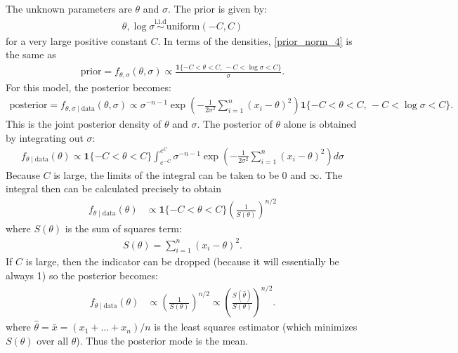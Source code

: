 \documentclass{scrartcl}
\begin{document}
The unknown parameters are $\theta$ and $\sigma$. The prior is given by:     
\begin{align}\label{prior_norm_4}
  \theta, \log \sigma \overset{\text{i.i.d}}{\sim} \text{uniform}(-C, C)
\end{align}
for a very large positive constant $C$. In terms of the densities,
\eqref{prior_norm_4} is the same as
\begin{align*}
\text{prior} = f_{\theta, \sigma}(\theta, \sigma)
\propto \frac{\mathbf{1}\{-C < \theta < C,\,-C < \log \sigma < C\}}{\sigma}.
\end{align*}
For this model, the posterior becomes: 
\begin{align*}
  \text{posterior} = f_{\theta, \sigma \mid \text{data}}(\theta,
                     \sigma)\propto \sigma^{-n-1}
                     \exp\left(-\frac{1}{2 
    \sigma^2}\sum_{i=1}^n(x_i - \theta)^2 \right)\mathbf{1}\{-C < \theta < C,\,-C < \log \sigma <
    C\}. 
\end{align*}
This is the joint posterior density of $\theta$ and $\sigma$. The
posterior of $\theta$ alone is obtained by integrating out $\sigma$: 
\begin{align*}
  f_{\theta \mid \text{data}}(\theta) \propto \mathbf{1}\{-C <
  \theta < C\} \int_{e^{-C}}^{e^C} \sigma^{-n-1} \exp\left(-\frac{1}{2
    \sigma^2}\sum_{i=1}^n(x_i - \theta)^2 \right) d\sigma
\end{align*}
Because $C$ is large, the limits of the integral can be taken to be
$0$ and $\infty$. The integral then can be calculated precisely to
obtain 
\begin{align*}
  f_{\theta \mid \text{data}}(\theta) &\propto \mathbf{1}\{-C <
  \theta < C\} \left(\frac{1}{S(\theta)} \right)^{n/2} 
\end{align*}
where $S(\theta)$ is the sum of squares term:
\begin{align*}
  S(\theta) = \sum_{i=1}^n (x_i - \theta)^2. 
\end{align*}
If $C$ is large, then the indicator can be dropped (because it will
essentially be always 1) so the posterior becomes:
\begin{align*}
  f_{\theta \mid \text{data}}(\theta) &\propto
                                        \left(\frac{1}{S(\theta)}
                                        \right)^{n/2} \propto
                                        \left(\frac{S(\hat{\theta})}{S(\theta)}
                                        \right)^{n/2}. 
\end{align*}
where $\hat{\theta} = \bar{x} =
(x_1 + \dots + x_n)/n$ is the least squares estimator (which minimizes
$S(\theta)$ over all $\theta$). Thus the posterior mode is the mean.
\end{document}
